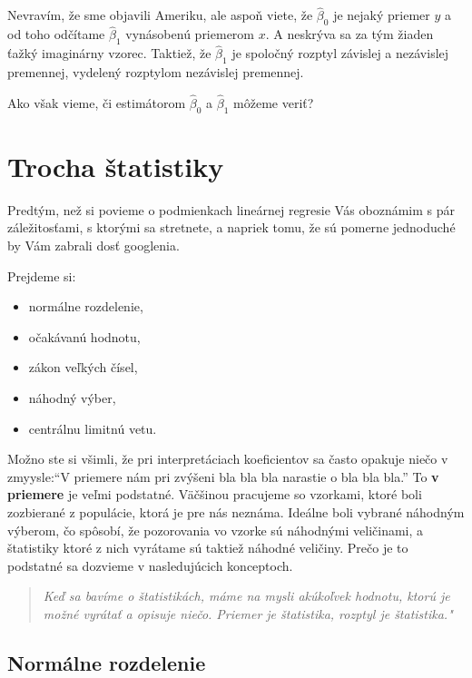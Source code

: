\documentclass[]{article}
\providecommand{\tightlist}{%
  \setlength{\itemsep}{0pt}\setlength{\parskip}{0pt}}
\begin{document}
Nevravím, že sme objavili Ameriku, ale aspoň viete, že \(\hat\beta_0\)
je nejaký priemer \(y\) a od toho odčítame \(\hat\beta_1\) vynásobenú
priemerom \(x\). A neskrýva sa za tým žiaden ťažký imaginárny vzorec.
Taktiež, že \(\hat\beta_1\) je spoločný rozptyl závislej a nezávislej
premennej, vydelený rozptylom nezávislej premennej.

Ako však vieme, či estimátorom \(\hat\beta_0\) a \(\hat\beta_1\) môžeme
veriť?

\hypertarget{trocha-ux161tatistiky}{%
\section{Trocha štatistiky}\label{trocha-ux161tatistiky}}

Predtým, než si povieme o podmienkach lineárnej regresie Vás oboznámim s
pár záležitosťami, s ktorými sa stretnete, a napriek tomu, že sú pomerne
jednoduché by Vám zabrali dosť googlenia.

Prejdeme si:

\begin{itemize}
\tightlist
\item
  normálne rozdelenie,
\item
  očakávanú hodnotu,
\item
  zákon veľkých čísel,
\item
  náhodný výber,
\item
  centrálnu limitnú vetu.
\end{itemize}

Možno ste si všimli, že pri interpretáciach koeficientov sa často
opakuje niečo v zmyysle:``V priemere nám pri zvýšeni bla bla bla
narastie o bla bla bla.'' To \textbf{v priemere} je veľmi podstatné.
Väčšinou pracujeme so vzorkami, ktoré boli zozbierané z populácie, ktorá
je pre nás neznáma. Ideálne boli vybrané náhodným výberom, čo spôsobí,
že pozorovania vo vzorke sú náhodnými veličinami, a štatistiky ktoré z
nich vyrátame sú taktiež náhodné veličiny. Prečo je to podstatné sa
dozvieme v nasledujúcich konceptoch.

\begin{quote}
\emph{Keď sa bavíme o štatistikách, máme na mysli akúkoľvek hodnotu,
ktorú je možné vyrátať a opisuje niečo. Priemer je štatistika, rozptyl
je štatistika."}
\end{quote}

\hypertarget{normuxe1lne-rozdelenie}{%
\subsection{Normálne rozdelenie}\label{normuxe1lne-rozdelenie}}
\end{document}
